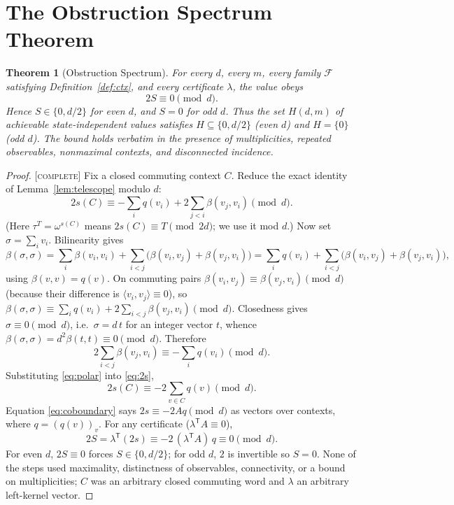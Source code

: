 \documentclass[11pt]{article}
\newtheorem{theorem}{Theorem}
\theoremstyle{definition}
\theoremstyle{remark}
\newcommand{\ip}[2]{\langle #1,#2\rangle}
\newcommand{\CO}{\textnormal{\textsc{[complete]}}}
\begin{document}
\section{The Obstruction Spectrum Theorem}\label{sec:spectrum}

\begin{theorem}[Obstruction Spectrum]\label{thm:spectrum}
For every $d$, every $m$, every family $\mathcal F$ satisfying Definition~\ref{def:ctx}, and every
certificate $\lambda$, the value obeys
\[
2S\equiv0\pmod d.
\]
Hence $S\in\{0,d/2\}$ for even $d$, and $S=0$ for odd $d$. Thus the set $H(d,m)$ of achievable
state-independent values satisfies $H\subseteq\{0,d/2\}$ (even $d$) and $H=\{0\}$ (odd $d$). The
bound holds verbatim in the presence of multiplicities, repeated observables, nonmaximal contexts,
and disconnected incidence.
\end{theorem}
\begin{proof}
\CO{} Fix a closed commuting context $C$. Reduce the exact identity of
Lemma~\ref{lem:telescope} modulo $d$:
\begin{equation}\label{eq:2s}
2s(C)\equiv-\sum_iq(v_i)+2\sum_{j<i}\beta(v_j,v_i)\pmod d .
\end{equation}
(Here $\tau^{T}=\omega^{s(C)}$ means $2s(C)\equiv T\pmod{2d}$; we use it mod $d$.) Now set
$\sigma=\sum_iv_i$. Bilinearity gives
\[
\beta(\sigma,\sigma)=\sum_i\beta(v_i,v_i)+\sum_{i<j}\bigl(\beta(v_i,v_j)+\beta(v_j,v_i)\bigr)
=\sum_iq(v_i)+\sum_{i<j}\bigl(\beta(v_i,v_j)+\beta(v_j,v_i)\bigr),
\]
using $\beta(v,v)=q(v)$. On commuting pairs $\beta(v_i,v_j)\equiv\beta(v_j,v_i)\pmod d$ (because
their difference is $\ip{v_i}{v_j}\equiv0$), so
$\beta(\sigma,\sigma)\equiv\sum_iq(v_i)+2\sum_{i<j}\beta(v_j,v_i)\pmod d$. Closedness gives
$\sigma\equiv0\pmod d$, i.e.\ $\sigma=d\,t$ for an integer vector $t$, whence
$\beta(\sigma,\sigma)=d^2\beta(t,t)\equiv0\pmod d$. Therefore
\begin{equation}\label{eq:polar}
2\sum_{i<j}\beta(v_j,v_i)\equiv-\sum_iq(v_i)\pmod d .
\end{equation}
Substituting \eqref{eq:polar} into \eqref{eq:2s},
\begin{equation}\label{eq:coboundary}
2s(C)\equiv-2\sum_{v\in C}q(v)\pmod d .
\end{equation}
Equation \eqref{eq:coboundary} says $2s\equiv-2Aq\pmod d$ as vectors over contexts, where
$q=(q(v))_v$. For any certificate ($\lambda^{\mathsf T}A\equiv0$),
\[
2S=\lambda^{\mathsf T}(2s)\equiv-2\,(\lambda^{\mathsf T}A)\,q\equiv0\pmod d .
\]
For even $d$, $2S\equiv0$ forces $S\in\{0,d/2\}$; for odd $d$, $2$ is invertible so $S=0$. None of
the steps used maximality, distinctness of observables, connectivity, or a bound on multiplicities;
$C$ was an arbitrary closed commuting word and $\lambda$ an arbitrary left-kernel vector.
\end{proof}
\end{document}
